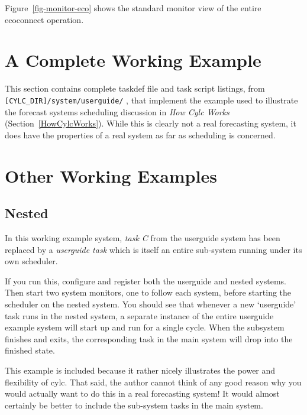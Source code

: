 \documentclass[11pt,a4paper]{article}
\begin{document}
Figure~\ref{fig-monitor-eco} shows the standard monitor view of the
entire ecoconnect operation.

\pagebreak
\section{A Complete Working Example}
\label{ACompleteWorkingExample}

This section contains complete taskdef file and task script listings,
from \lstinline= [CYLC_DIR]/system/userguide/= , that implement the
example used to illustrate the forecast systems scheduling discussion in
{\em How Cylc Works} (Section~\ref{HowCylcWorks}).  While this is
clearly not a real forecasting system, it does have the properties of a
real system as far as scheduling is concerned.  




\pagebreak


\section{Other Working Examples}
\label{OtherWorkingExamples}

\subsection{Nested}

In this working example system, {\em task C} from the userguide system
has been replaced by a {\em userguide task} which is itself an entire
sub-system running under its own scheduler.

If you run this, configure and register both the userguide and nested
systems. Then start two system monitors, one to follow each system,
before starting the scheduler on the nested system. You should see that 
whenever a new `userguide' task runs in the nested system, a separate
instance of the entire userguide example system will start up and run
for a single cycle. When the subsystem finishes and exits, the
corresponding task in the main system will drop into the finished state.

This example is included because it rather nicely illustrates the power
and flexibility of cylc. That said, the author cannot think of any good
reason why you would actually want to do this in a real forecasting
system! It would almost certainly be better to include the sub-system
tasks in the main system.
\end{document}
